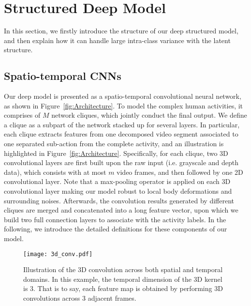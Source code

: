 \documentclass{sig-alternate}
\begin{document}
\section{Structured Deep Model}


In this section, we firstly introduce the structure of our deep structured model, and then explain how it can handle large intra-class variance with the latent structure.

\vspace{3mm}
\subsection{Spatio-temporal CNNs}

Our deep model is presented as a spatio-temporal convolutional neural network, as shown in Figure~\ref{fig:Architecture}. To model the complex human activities, it comprises of $M$ network cliques, which jointly conduct the final output. We define a clique as a subpart of the network stacked up for several layers. In particular, each clique extracts features from one decomposed video segment associated to one separated sub-action from the complete activity, and an illustration is highlighted in Figure~\ref{fig:Architecture}. Specifically, for each clique, two 3D convolutional layers are first built upon the raw input (i.e. grayscale and depth data), which consists with at most $m$ video frames, and then followed by one 2D convolutional layer. Note that a max-pooling operator is applied on each 3D convolutional layer making our model robust to local body deformations and surrounding noises.  Afterwards, the convolution results generated by different cliques are merged and concatenated into a long feature vector, upon which we build two full connection layers to associate with the activity labels.  In the following, we introduce the detailed definitions for these components of our model.


\begin{figure}[!ht]
\centering
\texttt{[image: 3d\_conv.pdf]}
\caption{Illustration of the 3D convolution across both spatial and temporal domains. In this example, the temporal dimension of the 3D kernel is 3. That is to say, each feature map is obtained by performing 3D convolutions across 3 adjacent frames.}\label{fig:conv3d}
\end{figure}
\end{document}
